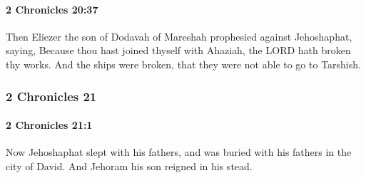 		\paragraph{2 Chronicles 20:37} %
			\label{2CHRONICLES-20-37}

			Then Eliezer the son of Dodavah of Mareshah prophesied against Jehoshaphat, saying, Because thou hast joined thyself with Ahaziah, the LORD hath broken thy works. And the ships were broken, that they were not able to go to Tarshish.

	\subsubsection{2 Chronicles 21} %
		\label{2CHRONICLES-21}

		\paragraph{2 Chronicles 21:1} %
			\label{2CHRONICLES-21-1}

			Now Jehoshaphat slept with his fathers, and was buried with his fathers in the city of David. And Jehoram his son reigned in his stead.

